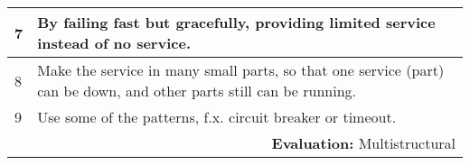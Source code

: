 \begin{longtable}{|p{0.3cm}|p{14.7cm}|}
7 & By failing fast but gracefully, providing limited service instead of no service. \\ \hline

8 & Make the service in many small parts, so that one service (part) can be down, and other parts still can be running. \\ \hline

9 & Use some of the patterns, f.x. circuit breaker or timeout. \\ \hline


\multicolumn{2}{r}{\textbf{Evaluation:} Multistructural} \\ 
\end{longtable}
\normalsize
